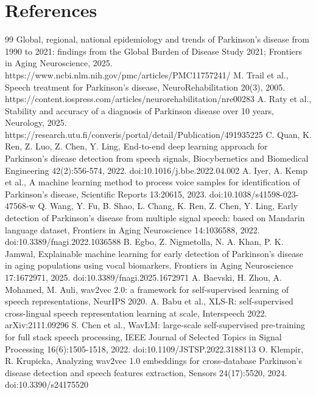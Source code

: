 \documentclass[11pt,a4paper]{article}
\begin{document}
\section*{References}
\begin{thebibliography}{99}\setlength{\itemsep}{1pt}\small
{} Global, regional, national epidemiology and trends of Parkinson's disease from 1990 to 2021: findings from the Global Burden of Disease Study 2021; Frontiers in Aging Neuroscience, 2025. https://www.ncbi.nlm.nih.gov/pmc/articles/PMC11757241/
 M. Trail et al., Speech treatment for Parkinson's disease, NeuroRehabilitation 20(3), 2005. https://content.iospress.com/articles/neurorehabilitation/nre00283
 A. Raty et al., Stability and accuracy of a diagnosis of Parkinson disease over 10 years, Neurology, 2025. https://research.utu.fi/converis/portal/detail/Publication/491935225
 C. Quan, K. Ren, Z. Luo, Z. Chen, Y. Ling, End-to-end deep learning approach for Parkinson's disease detection from speech signals, Biocybernetics and Biomedical Engineering 42(2):556-574, 2022. doi:10.1016/j.bbe.2022.04.002
 A. Iyer, A. Kemp et al., A machine learning method to process voice samples for identification of Parkinson's disease, Scientific Reports 13:20615, 2023. doi:10.1038/s41598-023-47568-w
 Q. Wang, Y. Fu, B. Shao, L. Chang, K. Ren, Z. Chen, Y. Ling, Early detection of Parkinson's disease from multiple signal speech: based on Mandarin language dataset, Frontiers in Aging Neuroscience 14:1036588, 2022. doi:10.3389/fnagi.2022.1036588
 B. Egbo, Z. Nigmetolla, N. A. Khan, P. K. Jamwal, Explainable machine learning for early detection of Parkinson's disease in aging populations using vocal biomarkers, Frontiers in Aging Neuroscience 17:1672971, 2025. doi:10.3389/fnagi.2025.1672971
 A. Baevski, H. Zhou, A. Mohamed, M. Auli, wav2vec 2.0: a framework for self-supervised learning of speech representations, NeurIPS 2020.
 A. Babu et al., XLS-R: self-supervised cross-lingual speech representation learning at scale, Interspeech 2022. arXiv:2111.09296
 S. Chen et al., WavLM: large-scale self-supervised pre-training for full stack speech processing, IEEE Journal of Selected Topics in Signal Processing 16(6):1505-1518, 2022. doi:10.1109/JSTSP.2022.3188113
 O. Klempir, R. Krupicka, Analyzing wav2vec 1.0 embeddings for cross-database Parkinson's disease detection and speech features extraction, Sensors 24(17):5520, 2024. doi:10.3390/s24175520

\end{thebibliography}
\end{document}
